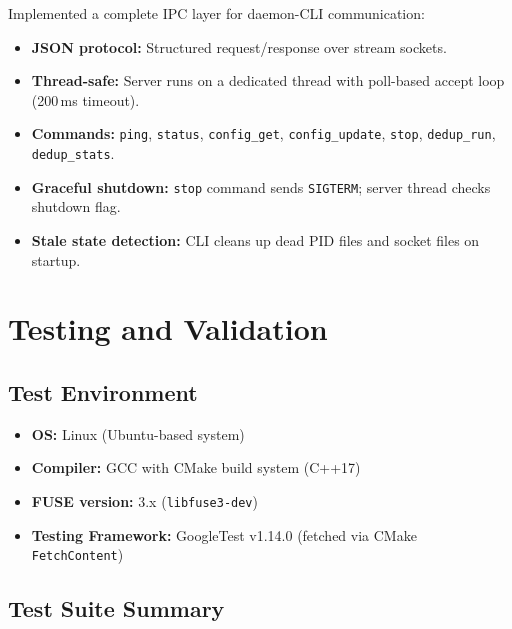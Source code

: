 \documentclass[12pt, a4paper]{article}
\begin{document}
Implemented a complete IPC layer for daemon-CLI communication:

\begin{itemize}
  \item \textbf{JSON protocol:} Structured request/response over stream sockets.
  \item \textbf{Thread-safe:} Server runs on a dedicated thread with poll-based accept loop (200\,ms timeout).
  \item \textbf{Commands:} \texttt{ping}, \texttt{status}, \texttt{config\_get}, \texttt{config\_update}, \texttt{stop}, \texttt{dedup\_run}, \texttt{dedup\_stats}.
  \item \textbf{Graceful shutdown:} \texttt{stop} command sends \texttt{SIGTERM}; server thread checks shutdown flag.
  \item \textbf{Stale state detection:} CLI cleans up dead PID files and socket files on startup.
\end{itemize}

\section{Testing and Validation}

\subsection{Test Environment}

\begin{itemize}
  \item \textbf{OS:} Linux (Ubuntu-based system)
  \item \textbf{Compiler:} GCC with CMake build system (C++17)
  \item \textbf{FUSE version:} 3.x (\texttt{libfuse3-dev})
  \item \textbf{Testing Framework:} GoogleTest v1.14.0 (fetched via CMake \texttt{FetchContent})
\end{itemize}

\subsection{Test Suite Summary}
\end{document}
